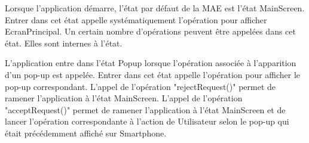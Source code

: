 \newline
Lorsque l'application {\nomApplication} démarre, l'état par défaut de la MAE est l'état MainScreen. Entrer dans cet état appelle systématiquement l'opération pour afficher EcranPrincipal. Un certain nombre d'opérations peuvent être appelées dans cet état. Elles sont internes à l'état. \newline

L'application {\nomApplication} entre dans l'état Popup lorsque l'opération associée à l'apparition d'un pop-up est appelée. Entrer dans cet état appelle l'opération pour afficher le pop-up correspondant. L'appel de l'opération "rejectRequest()" permet de ramener l'application {\nomApplication} à l'état MainScreen. L'appel de l'opération "acceptRequest()" permet de ramener l'application {\nomApplication} à l'état MainScreen et de lancer l'opération correspondante à l'action de Utilisateur selon le pop-up qui était précédemment affiché sur Smartphone. 
